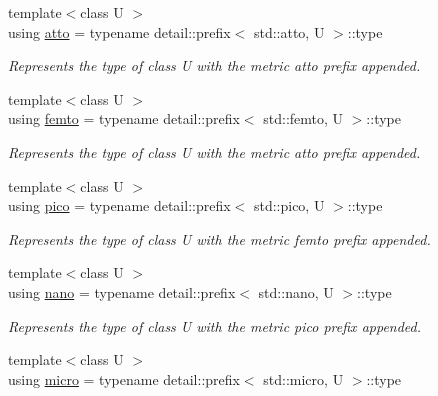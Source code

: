 \begin{DoxyCompactItemize}
\item 
{\footnotesize template$<$class U $>$ }\\using \hyperlink{group___unit_manipulators_ga8a7180c782263384a118dc8ffa5bc689}{atto} = typename detail\+::prefix$<$ std\+::atto, U $>$\+::type
\begin{DoxyCompactList}\small\item\em Represents the type of {\ttfamily class U} with the metric \textquotesingle{}atto\textquotesingle{} prefix appended. \end{DoxyCompactList}\item 
{\footnotesize template$<$class U $>$ }\\using \hyperlink{group___unit_manipulators_gab3c39c4b3083f6ca59ee0fd0e116f814}{femto} = typename detail\+::prefix$<$ std\+::femto, U $>$\+::type
\begin{DoxyCompactList}\small\item\em Represents the type of {\ttfamily class U} with the metric \textquotesingle{}atto\textquotesingle{} prefix appended. \end{DoxyCompactList}\item 
{\footnotesize template$<$class U $>$ }\\using \hyperlink{group___unit_manipulators_ga82a8d14a3e0877a375a66b64c45baab9}{pico} = typename detail\+::prefix$<$ std\+::pico, U $>$\+::type
\begin{DoxyCompactList}\small\item\em Represents the type of {\ttfamily class U} with the metric \textquotesingle{}femto\textquotesingle{} prefix appended. \end{DoxyCompactList}\item 
{\footnotesize template$<$class U $>$ }\\using \hyperlink{group___unit_manipulators_ga1c25c3c1d6c1f3aed3fd1ecf043110d5}{nano} = typename detail\+::prefix$<$ std\+::nano, U $>$\+::type
\begin{DoxyCompactList}\small\item\em Represents the type of {\ttfamily class U} with the metric \textquotesingle{}pico\textquotesingle{} prefix appended. \end{DoxyCompactList}\item 
{\footnotesize template$<$class U $>$ }\\using \hyperlink{group___unit_manipulators_gaea53c906ec805110b93f02db4a961971}{micro} = typename detail\+::prefix$<$ std\+::micro, U $>$\+::type

\end{DoxyCompactItemize}
